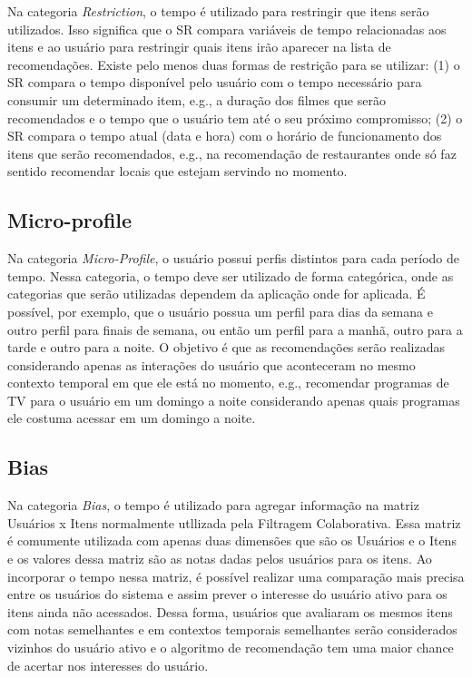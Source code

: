 Na categoria \textit{Restriction}, o tempo é utilizado para restringir que itens serão utilizados. Isso significa que o SR
compara variáveis de tempo relacionadas aos itens e ao usuário para restringir quais itens irão aparecer na lista de
recomendações. Existe pelo menos duas formas de restrição para se utilizar: (1) o SR compara o tempo disponível pelo
usuário com o tempo necessário para consumir um determinado item, e.g., a duração dos filmes que serão recomendados e
o tempo que o usuário tem até o seu próximo compromisso; (2) o SR compara o tempo atual (data e hora) com o horário de
funcionamento dos itens que serão recomendados, e.g., na recomendação de restaurantes onde só faz sentido recomendar
locais que estejam servindo no momento.

\subsection{Micro-profile}

Na categoria \textit{Micro-Profile}, o usuário possui perfis distintos para cada período de tempo. Nessa categoria, o tempo
deve ser utilizado de forma categórica, onde as categorias que serão utilizadas dependem da aplicação onde for aplicada.
É possível, por exemplo, que o usuário possua um perfil para dias da semana e outro perfil para finais de semana, ou
então um perfil para a manhã, outro para a tarde e outro para a noite. O objetivo é que as recomendações serão
realizadas considerando apenas as interações do usuário que aconteceram no mesmo contexto temporal em que ele está no
momento, e.g., recomendar programas de TV para o usuário em um domingo a noite considerando apenas quais programas ele
costuma acessar em um domingo a noite.

\subsection{Bias}

Na categoria \textit{Bias}, o tempo é utilizado para agregar informação na matriz Usuários x Itens normalmente utllizada pela
Filtragem Colaborativa. Essa matriz é comumente utilizada com apenas duas dimensões que são os Usuários e o Itens e os
valores dessa matriz são as notas dadas pelos usuários para os itens. Ao incorporar o tempo nessa matriz, é possível
realizar uma comparação mais precisa entre os usuários do sistema e assim prever o interesse do usuário ativo para os
itens ainda não acessados. Dessa forma, usuários que avaliaram os mesmos itens com notas semelhantes e em contextos
temporais semelhantes serão considerados vizinhos do usuário ativo e o algoritmo de recomendação tem uma maior chance
de acertar nos interesses do usuário.

